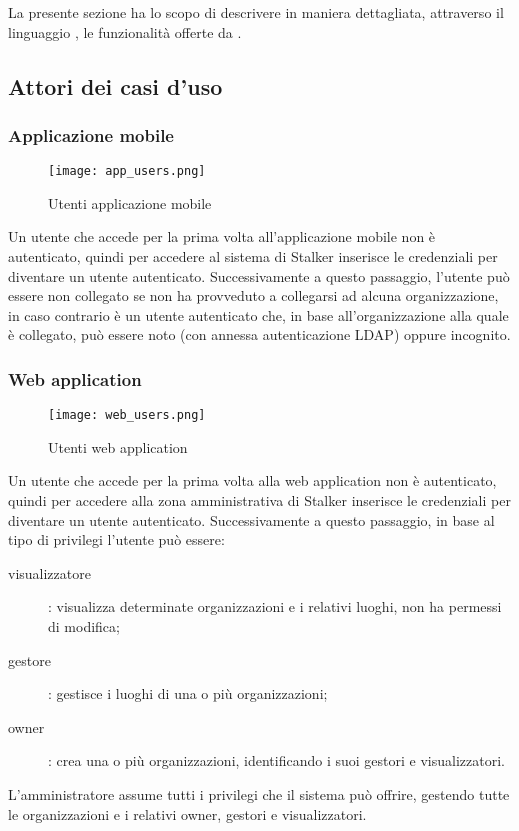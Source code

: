 \documentclass[../analisi-dei-requisiti.tex]{subfiles}
\begin{document}
La presente sezione ha lo scopo di descrivere in maniera dettagliata, attraverso il linguaggio , le funzionalità offerte da .

\subsection{Attori dei casi d'uso}%
\label{sub:attori_casi_duso}

\subsubsection{Applicazione mobile}%
\label{subs:mobile_app}

\begin{figure}[H]
  \centering
  \texttt{[image: app\_users.png]}
  \caption{Utenti applicazione mobile}%
  \label{fig:usersapp}
\end{figure}

Un utente che accede per la prima volta all'applicazione mobile non è autenticato, quindi per accedere al sistema di Stalker inserisce le
credenziali per diventare un utente autenticato.
Successivamente a questo passaggio, l'utente può essere non collegato se non ha provveduto a collegarsi ad alcuna organizzazione, in caso contrario
è un utente autenticato che, in base all'organizzazione alla quale è collegato, può essere noto (con annessa autenticazione LDAP) oppure incognito.

\subsubsection{Web application}%
\label{subs:web_application}

\begin{figure}[H]
  \centering
  \texttt{[image: web\_users.png]}
  \caption{Utenti web application}%
  \label{fig:usersweb}
\end{figure}

Un utente che accede per la prima volta alla web application non è autenticato, quindi per accedere alla zona amministrativa di Stalker inserisce le
credenziali per diventare un utente autenticato.
Successivamente a questo passaggio, in base al tipo di privilegi l'utente può essere:
\begin{description}
  \item[visualizzatore]: visualizza determinate organizzazioni e i relativi luoghi, non ha permessi di modifica;
  \item[gestore]: gestisce i luoghi di una o più organizzazioni;
  \item[owner]: crea una o più organizzazioni, identificando i suoi gestori e visualizzatori.
\end{description}
L'amministratore assume tutti i privilegi che il sistema può offrire, gestendo tutte le organizzazioni e i relativi owner, gestori e visualizzatori.
\end{document}
